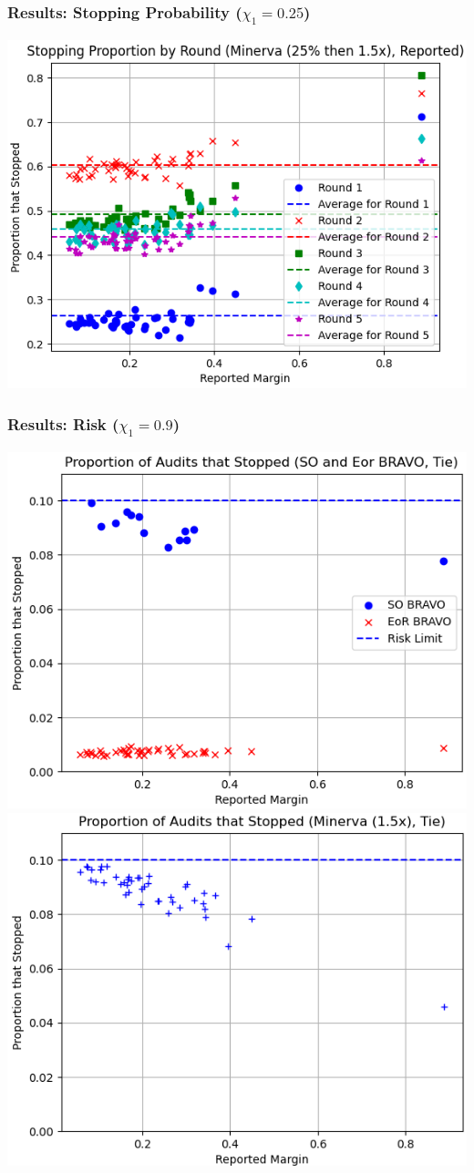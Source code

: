 \documentclass{beamer}
\begin{document}
\begin{frame}
\frametitle{Results: Stopping Probability ($\chi_1=0.25$)}

\includegraphics[width=1\textwidth]{minerva25percthen1p5_sprob.png}
\end{frame}


\begin{frame}
\frametitle{Results: Risk ($\chi_1=0.9$)}


\hspace{-.5cm} 
\includegraphics[width=.5\textwidth]{bravo_risks.png}
\pause 
\includegraphics[width=.5\textwidth]{riskminerva1p5_10t4.png}

\end{frame}
\end{document}
